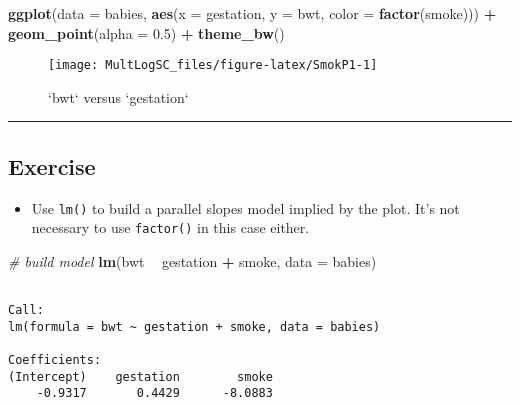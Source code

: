\documentclass[
]{book}
\newenvironment{Shaded}{\begin{snugshade}}{\end{snugshade}}
\newcommand{\CommentTok}[1]{\textcolor[rgb]{0.56,0.35,0.01}{\textit{#1}}}
\newcommand{\DataTypeTok}[1]{\textcolor[rgb]{0.13,0.29,0.53}{#1}}
\newcommand{\FloatTok}[1]{\textcolor[rgb]{0.00,0.00,0.81}{#1}}
\newcommand{\KeywordTok}[1]{\textcolor[rgb]{0.13,0.29,0.53}{\textbf{#1}}}
\newcommand{\NormalTok}[1]{#1}
\newcommand{\OperatorTok}[1]{\textcolor[rgb]{0.81,0.36,0.00}{\textbf{#1}}}
\newcommand{\StringTok}[1]{\textcolor[rgb]{0.31,0.60,0.02}{#1}}
\providecommand{\tightlist}{%
  \setlength{\itemsep}{0pt}\setlength{\parskip}{0pt}}
\begin{document}
\begin{Shaded}
\begin{Highlighting}[]
\KeywordTok{ggplot}\NormalTok{(}\DataTypeTok{data =}\NormalTok{ babies, }\KeywordTok{aes}\NormalTok{(}\DataTypeTok{x =}\NormalTok{ gestation, }\DataTypeTok{y =}\NormalTok{ bwt, }\DataTypeTok{color =} \KeywordTok{factor}\NormalTok{(smoke))) }\OperatorTok{+}
\StringTok{  }\KeywordTok{geom_point}\NormalTok{(}\DataTypeTok{alpha =} \FloatTok{0.5}\NormalTok{) }\OperatorTok{+}
\StringTok{  }\KeywordTok{theme_bw}\NormalTok{()}
\end{Highlighting}
\end{Shaded}

\begin{figure}

{\centering \texttt{[image: MultLogSC\_files/figure-latex/SmokP1-1]} 

}

\caption{`bwt` versus `gestation`}\label{fig:SmokP1}
\end{figure}

\begin{center}\rule{0.5\linewidth}{0.5pt}\end{center}

\hypertarget{exercise-3}{%
\subsection*{Exercise}\label{exercise-3}}

\begin{itemize}
\tightlist
\item
  Use \texttt{lm()} to build a parallel slopes model implied by the plot. It's not necessary to use \texttt{factor()} in this case either.
\end{itemize}

\begin{Shaded}
\begin{Highlighting}[]
\CommentTok{# build model}
\KeywordTok{lm}\NormalTok{(bwt }\OperatorTok{~}\StringTok{ }\NormalTok{gestation }\OperatorTok{+}\StringTok{ }\NormalTok{smoke, }\DataTypeTok{data =}\NormalTok{ babies)}
\end{Highlighting}
\end{Shaded}

\begin{verbatim}

Call:
lm(formula = bwt ~ gestation + smoke, data = babies)

Coefficients:
(Intercept)    gestation        smoke  
    -0.9317       0.4429      -8.0883  
\end{verbatim}
\end{document}
